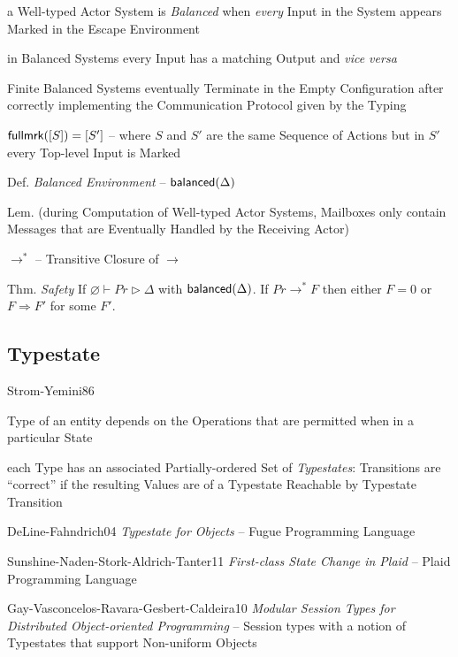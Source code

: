 a Well-typed Actor System is \emph{Balanced} when \emph{every} Input
in the System appears Marked in the Escape Environment

in Balanced Systems every Input has a matching Output and \emph{vice
  versa}

Finite Balanced Systems eventually Terminate in the Empty
Configuration after correctly implementing the Communication Protocol
given by the Typing


$\mathsf{fullmrk}([S]) = [S']$ -- where $S$ and $S'$ are the same Sequence of
Actions but in $S'$ every Top-level Input is Marked

Def. \emph{Balanced Environment} -- $\mathsf{balanced}(\Delta)$ %

Lem. (during Computation of Well-typed Actor Systems, Mailboxes only
contain Messages that are Eventually Handled by the Receiving Actor)

$\longrightarrow^*$ -- Transitive Closure of $\longrightarrow$

Thm. \emph{Safety} If $\varnothing \vdash Pr \rhd \Delta$ with
$\mathsf{balanced}(\Delta)$. If $Pr \longrightarrow^* F$ then either $F = 0$
or $F \Rightarrow F'$ for some $F'$.


\endgroup



\subsection{Typestate}\label{sec:typestate}

Strom-Yemini86

Type of an entity depends on the Operations that are permitted when in
a particular State

each Type has an associated Partially-ordered Set of
\emph{Typestates}: Transitions are ``correct'' if the resulting Values
are of a Typestate Reachable by Typestate Transition

DeLine-Fahndrich04 \emph{Typestate for Objects} -- Fugue Programming
Language

Sunshine-Naden-Stork-Aldrich-Tanter11 \emph{First-class State Change
  in Plaid} -- Plaid Programming Language

Gay-Vasconcelos-Ravara-Gesbert-Caldeira10 \emph{Modular Session Types
  for Distributed Object-oriented Programming} -- Session types with a
notion of Typestates that support Non-uniform Objects




